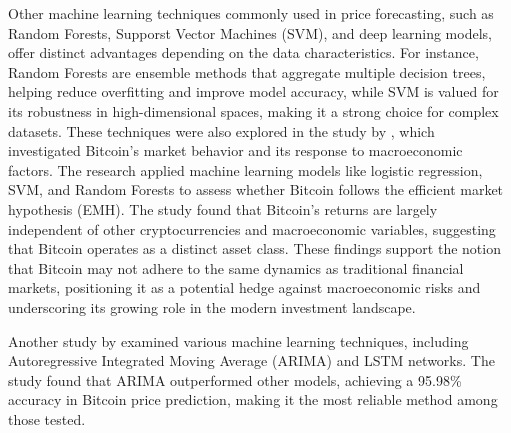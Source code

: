 Other machine learning techniques commonly used in price forecasting, such as Random Forests, Supporst Vector Machines (SVM), and deep learning models, offer distinct advantages depending on the data characteristics. For instance, Random Forests are ensemble methods that aggregate multiple decision trees, helping reduce overfitting and improve model accuracy, while SVM is valued for its robustness in high-dimensional spaces, making it a strong choice for complex datasets. These techniques were also explored in the study by \textcite{athanasia2023predicting} , which investigated Bitcoin’s market behavior and its response to macroeconomic factors. The research applied machine learning models like logistic regression, SVM, and Random Forests to assess whether Bitcoin follows the efficient market hypothesis (EMH). The study found that Bitcoin’s returns are largely independent of other cryptocurrencies and macroeconomic variables, suggesting that Bitcoin operates as a distinct asset class. These findings support the notion that Bitcoin may not adhere to the same dynamics as traditional financial markets, positioning it as a potential hedge against macroeconomic risks and underscoring its growing role in the modern investment landscape.

Another study by \textcite{Adnan2023} examined various machine learning techniques, including Autoregressive Integrated Moving Average (ARIMA) and LSTM networks. The study found that ARIMA outperformed other models, achieving a 95.98\% accuracy in Bitcoin price prediction, making it the most reliable method among those tested.

